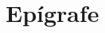 \clearpage
\pagestyle{fancy}
\fancyhead{}
\fancyhead[RO,LE]{\thepage}
\fancyfoot{}
\fancyfoot[LE,RO]{}
\fancyfoot[LO,CE]{}
\fancyfoot[CO,RE]{}
\vspace*{0.7cm}
\section*{\hfill Epígrafe}
\vspace*{\fill}
\begin{flushright}
\epigrafe
\end{flushright}


